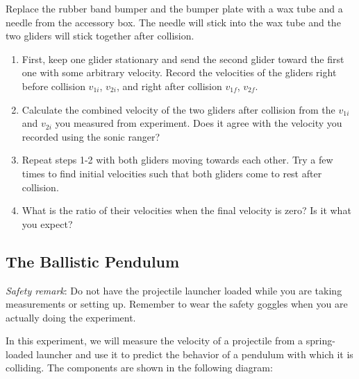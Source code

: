 Replace the rubber band bumper and the bumper plate with a wax tube and a needle from the accessory box. The needle will stick into the wax tube and the two gliders will stick together after collision.
\begin{enumerate}
\item First, keep one glider stationary and send the second glider toward the first one with some arbitrary velocity. Record the velocities of the gliders right before collision $v_{1i}$, $v_{2i}$, and right after collision $v_{1f}$, $v_{2f}$.
    \item Calculate the combined velocity of the two gliders after collision from the $v_{1i}$ and $v_{2i}$ you measured from experiment. Does it agree with the velocity you recorded using the sonic ranger?
    \item Repeat  steps 1-2 with both gliders moving towards each other. Try a few times to find initial velocities such that both gliders come to rest after collision. 
\item What is the ratio of their velocities when the final velocity is zero? Is it what you expect?
\end{enumerate}



\subsection{The Ballistic Pendulum}
\emph{Safety remark}: Do not have the projectile launcher loaded while you are taking measurements or setting up. Remember to wear the safety goggles when you are actually doing the experiment.\myskip

In this experiment, we will measure the velocity of a projectile from a spring-loaded launcher and use it to predict the behavior of a pendulum with which it is colliding. The components are shown in the following diagram:

